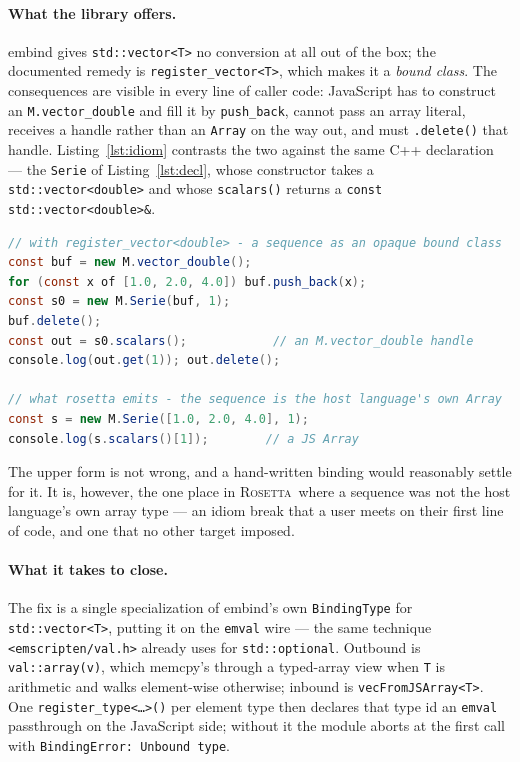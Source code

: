 \documentclass[11pt,a4paper]{article}
\newcommand{\rosetta}{\textsc{Rosetta}}
\newcommand{\code}[1]{\texttt{\small #1}}
\begin{document}
\paragraph{What the library offers.} embind gives \code{std::vector<T>} no
conversion at all out of the box; the documented remedy is
\code{register\_vector<T>}, which makes it a \emph{bound class}. The
consequences are visible in every line of caller code: JavaScript has to
construct an \code{M.vector\_double} and fill it by \code{push\_back}, cannot
pass an array literal, receives a handle rather than an \code{Array} on the way
out, and must \code{.delete()} that handle. Listing~\ref{lst:idiom} contrasts
the two against the same C++ declaration --- the \code{Serie} of
Listing~\ref{lst:decl}, whose constructor takes a \code{std::vector<double>} and
whose \code{scalars()} returns a \code{const std::vector<double>\&}.

\begin{lstlisting}[language=Java,caption={The same two C++ signatures, seen from JavaScript. Above: what \code{register\_vector} yields. Below: what \rosetta\ emits.},label={lst:idiom}]
// with register_vector<double> - a sequence as an opaque bound class
const buf = new M.vector_double();
for (const x of [1.0, 2.0, 4.0]) buf.push_back(x);
const s0 = new M.Serie(buf, 1);
buf.delete();
const out = s0.scalars();            // an M.vector_double handle
console.log(out.get(1)); out.delete();

// what rosetta emits - the sequence is the host language's own Array
const s = new M.Serie([1.0, 2.0, 4.0], 1);
console.log(s.scalars()[1]);        // a JS Array
\end{lstlisting}

The upper form is not wrong, and a hand-written binding would reasonably settle
for it. It is, however, the one place in \rosetta\ where a sequence was not the
host language's own array type --- an idiom break that a user meets on their
first line of code, and one that no other target imposed.

\paragraph{What it takes to close.} The fix is a single specialization of
embind's own \code{BindingType} for \code{std::vector<T>}, putting it on the
\code{emval} wire --- the same technique \code{<emscripten/val.h>} already uses
for \code{std::optional}. Outbound is \code{val::array(v)}, which memcpy's
through a typed-array view when \code{T} is arithmetic and walks element-wise
otherwise; inbound is \code{vecFromJSArray<T>}. One
\code{register\_type<\dots>()} per element type then declares that type id an
\code{emval} passthrough on the JavaScript side; without it the module aborts at
the first call with \code{BindingError: Unbound type}.
\end{document}

